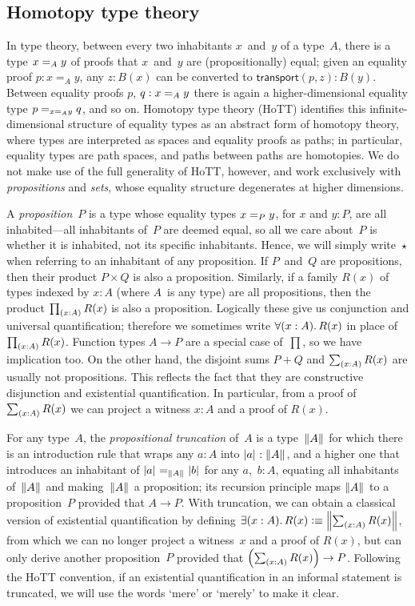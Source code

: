 \documentclass[a4paper,UKenglish,numberwithinsect,cleveref,thm-restate,draft]{lipics-v2021}
\numberwithin{equation}{section}
\theoremstyle{definition}
\theoremstyle{plain}
\begin{document}
\subsection{Homotopy type theory}
In type theory, between every two inhabitants $x$~and~$y$ of a type~$A$, there is a type $\id[A]{x}{y}$ of proofs that $x$~and~$y$ are (propositionally) equal; given an equality proof $p : x =_A y$, any $z : B(x)$ can be converted to $\mathsf{transport}(p, z) : B(y)$.
Between equality proofs $p$, $q : \id[A]{x}{y}$ there is again a higher-dimensional equality type $\id[{\id[A]{x}{y}}]{p}{q}$, and so on.
Homotopy type theory (HoTT) identifies this infinite-dimensional structure of equality types as an abstract form of homotopy theory, where types are interpreted as spaces and equality proofs as paths; in particular, equality types are path spaces, and paths between paths are homotopies.
We do not make use of the full generality of HoTT, however, and work exclusively with \emph{propositions} and \emph{sets}, whose equality structure degenerates at higher dimensions.%

A \emph{proposition}~$P$ is a type whose equality types $\id[P]{x}{y}$, for $x$ and $y : P$, are all inhabited---all inhabitants of~$P$ are deemed equal, so all we care about~$P$ is whether it is inhabited, not its specific inhabitants.
Hence, we will simply write~$\star$ when referring to an inhabitant of any proposition.
If $P$~and~$Q$ are propositions, then their product $P \times Q$ is also a proposition.
Similarly, if a family $R(x)$ of types indexed by $x : A$ (where $A$~is any type) are all propositions, then the product $\prd{x : A} R(x)$ is also a proposition.
Logically these give us conjunction and universal quantification; therefore we sometimes write $\fall{x : A} R(x)$ in place of $\prd{x : A} R(x)$.
Function types $A \to P$ are a special case of~$\prod$, so we have implication too.
On the other hand, the disjoint sums $P + Q$ and $\sm{x : A} R(x)$ are usually not propositions.
This reflects the fact that they are constructive disjunction and existential quantification.
In particular, from a proof of $\sm{x : A} R(x)$ we can project a witness $x : A$ and a proof of $R(x)$.

For any type~$A$, the \emph{propositional truncation} of~$A$ is a type~$\brck A$ for which there is an introduction rule that wraps any $a : A$ into $\bproj{a} : \brck A$, and a higher one that introduces an inhabitant of $\bproj{a} =_{\brck A} \bproj{b}$ for any $a$,~$b : A$, equating all inhabitants of~$\brck A$ and making~$\brck A$ a proposition; its recursion principle maps $\brck A$ to a proposition~$P$ provided that $A \to P$.
With truncation, we can obtain a classical version of existential quantification by defining $\exis{x : A} R(x) \defeq \brck{\sm{x : A} R(x)}$, from which we can no longer project a witness~$x$ and a proof of $R(x)$, but can only derive another proposition~$P$ provided that $\left(\sm{x : A} R(x)\right) \to P$.
Following the HoTT convention, if an existential quantification in an informal statement is truncated, we will use the words `mere' or `merely' to make it clear.
\end{document}
